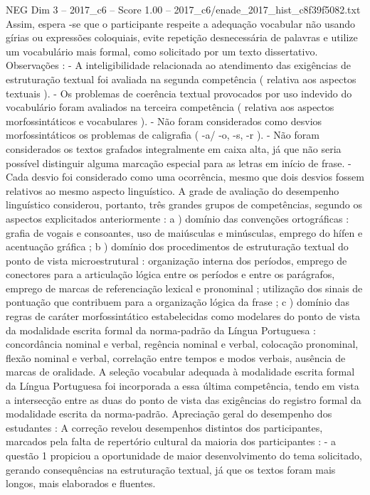\begin{textsample}{NEG Dim 3 – 2017\_c6 – Score 1.00 – 2017\_c6/enade\_2017\_hist\_c8f39f5082.txt}
Assim, espera -se que o participante respeite a adequação vocabular não usando gírias ou expressões coloquiais, evite repetição desnecessária de palavras e utilize um vocabulário mais formal, como solicitado por um texto dissertativo.
Observações : - A inteligibilidade relacionada ao atendimento das exigências de estruturação textual foi avaliada na segunda competência ( relativa aos aspectos textuais ). - Os problemas de coerência textual provocados por uso indevido do vocabulário foram avaliados na terceira competência ( relativa aos aspectos morfossintáticos e vocabulares ). - Não foram considerados como desvios morfossintáticos os problemas de caligrafia ( -a/ -o, -s, -r ). - Não foram considerados os textos grafados integralmente em caixa alta, já que não seria possível distinguir alguma marcação especial para as letras em início de frase. - Cada desvio foi considerado como uma ocorrência, mesmo que dois desvios fossem relativos ao mesmo aspecto linguístico.
A grade de avaliação do desempenho linguístico considerou, portanto, três grandes grupos de competências, segundo os aspectos explicitados anteriormente : a ) domínio das convenções ortográficas : grafia de vogais e consoantes, uso de maiúsculas e minúsculas, emprego do hífen e acentuação gráfica ; b ) domínio dos procedimentos de estruturação textual do ponto de vista microestrutural : organização interna dos períodos, emprego de conectores para a articulação lógica entre os períodos e entre os parágrafos, emprego de marcas de referenciação lexical e pronominal ; utilização dos sinais de pontuação que contribuem para a organização lógica da frase ; c ) domínio das regras de caráter morfossintático estabelecidas como modelares do ponto de vista da modalidade escrita formal da norma-padrão da Língua Portuguesa : concordância nominal e verbal, regência nominal e verbal, colocação pronominal, flexão nominal e verbal, correlação entre tempos e modos verbais, ausência de marcas de oralidade.
A seleção vocabular adequada à modalidade escrita formal da Língua Portuguesa foi incorporada a essa última competência, tendo em vista a intersecção entre as duas do ponto de vista das exigências do registro formal da modalidade escrita da norma-padrão.
Apreciação geral do desempenho dos estudantes : A correção revelou desempenhos distintos dos participantes, marcados pela falta de repertório cultural da maioria dos participantes : - a questão 1 propiciou a oportunidade de maior desenvolvimento do tema solicitado, gerando consequências na estruturação textual, já que os textos foram mais longos, mais elaborados e fluentes.

\end{textsample}
